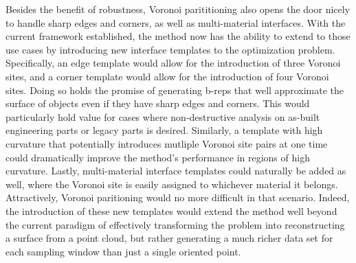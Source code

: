 Besides the benefit of robustness, Voronoi parititioning also opens the door nicely to handle sharp edges and corners, as well as multi-material interfaces. With the current framework established, the method now has the ability to extend to those use cases by introducing new interface templates to the optimization problem. Specifically, an edge template would allow for the introduction of three Voronoi sites, and a corner template would allow for the introduction of four Voronoi sites. Doing so holds the promise of generating b-reps that well approximate the surface of objects even if they have sharp edges and corners. This would particularly hold value for cases where non-destructive analysis on as-built engineering parts or legacy parts is desired. Similarly, a template with high curvature that potentially introduces mutliple Voronoi site pairs at one time could dramatically improve the method's performance in regions of high curvature. Lastly, multi-material interface templates could naturally be added as well, where the Voronoi site is easily assigned to whichever material it belongs. Attractively, Voronoi paritioning would no more difficult in that scenario. Indeed, the introduction of these new templates would extend the method well beyond the current paradigm of effectively transforming the problem into reconstructing a surface from a point cloud, but rather generating a much richer data set for each sampling window than just a single oriented point.